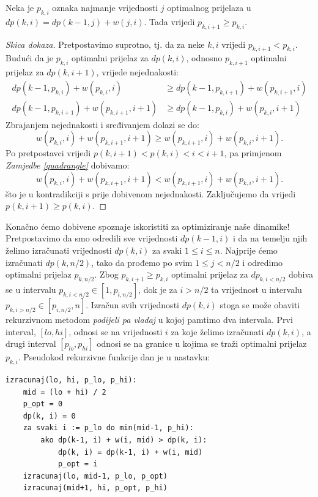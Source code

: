 \begin{zamjedba}
  Neka je $p_{k,i}$ oznaka najmanje vrijednosti $j$ optimalnog prijelaza u
  $dp(k,i) = dp(k-1,j) + w(j, i)$. Tada vrijedi $p_{k,i+1} \ge p_{k,i}$.
\end{zamjedba}

\begin{proof}[Skica dokaza]
  Pretpostavimo suprotno, tj. da za neke $k, i$
  vrijedi $p_{k,i+1} < p_{k,i}$. Budući da je $p_{k,i}$ optimalni prijelaz
  za $dp(k,i)$, odnosno $p_{k,i+1}$ optimalni prijelaz za $dp(k,i+1)$,
  vrijede nejednakosti:
  \begin{equation*}
    \begin{aligned}
      dp(k-1,p_{k,i}) + w(p_{k,i}, i) &\geq dp(k-1,p_{k,i+1}) + w(p_{k,i+1},i) \\
      dp(k-1,p_{k,i+1}) + w(p_{k,i+1},i+1) &\geq dp(k-1,p_{k,i}) + w(p_{k,i},i+1)
    \end{aligned}
  \end{equation*}
  Zbrajanjem nejednakosti i sređivanjem dolazi se do:
  \begin{equation*}
    w(p_{k,i},i) + w(p_{k,i+1},i+1) \geq w(p_{k,i+1},i) + w(p_{k,i},i+1).
  \end{equation*}
  Po pretpostavci vrijedi $p(k,i+1) < p(k,i) < i < i+1$, pa primjenom
  \textit{Zamjedbe \ref{quadrangle}} dobivamo:
  \begin{equation*}
    w(p_{k,i},i) + w(p_{k,i+1},i+1) < w(p_{k,i+1},i) + w(p_{k,i},i+1).
  \end{equation*}
  što je u kontradikciji s prije dobivenom nejednakosti. Zaključujemo
  da vrijedi $p(k,i+1) \geq p(k,i)$.
\end{proof}
 
Konačno ćemo dobivene spoznaje iskoristiti za optimiziranje naše dinamike!
Pretpostavimo da smo odredili sve vrijednosti $dp(k-1,i)$ i da na temelju
njih želimo izračunati vrijednosti $dp(k,i)$ za svaki $1 \le i \le n$.
Najprije ćemo izračunati $dp(k,n/2)$, tako da prođemo po svim $1 \le j < n/2$
i odredimo optimalni prijelaz $p_{k,n/2}$. Zbog $p_{k,i+1} \ge p_{k,i}$ optimalni prijelaz
za $dp_{k,i<n/2}$ dobiva se u intervalu $p_{k,i<n/2} \in [1, p_{i,n/2}]$,
dok je za $i>n/2$ ta vrijednost u intervalu $p_{k,i>n/2} \in [p_{i,n/2},n]$.
Izračun svih vrijednosti $dp(k,i)$ stoga se može obaviti rekurzivnom metodom
\textit{podijeli pa vladaj} u kojoj pamtimo dva intervala. Prvi interval,
$[lo, hi]$, odnosi se na vrijednosti $i$ za koje želimo izračunati $dp(k, i)$,
a drugi interval $[p_{lo}, p_{hi}]$ odnosi se na granice u kojima se traži
optimalni prijelaz $p_{k,i}$. Pseudokod rekurzivne funkcije dan je u nastavku:
\begin{verbatim}
izracunaj(lo, hi, p_lo, p_hi):
    mid = (lo + hi) / 2
    p_opt = 0
    dp(k, i) = 0
    za svaki i := p_lo do min(mid-1, p_hi):
        ako dp(k-1, i) + w(i, mid) > dp(k, i):
            dp(k, i) = dp(k-1, i) + w(i, mid)
            p_opt = i
    izracunaj(lo, mid-1, p_lo, p_opt)
    izracunaj(mid+1, hi, p_opt, p_hi)
\end{verbatim}

